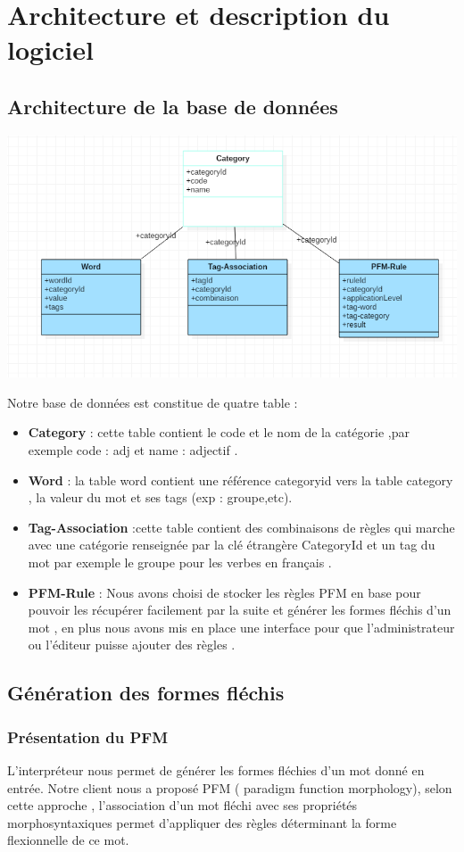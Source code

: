 \documentclass[12pt,a4paper]{article}
\begin{document}
\section{Architecture et description du logiciel}
\subsection{Architecture de la base de données }

\includegraphics[width=150mm]{img/basefinal.PNG}

Notre base de données est constitue de quatre table : 
\begin{itemize}
\item \textbf{Category} : cette table contient le code et le nom de la catégorie ,par exemple code : adj et name : adjectif .
\item \textbf{Word} : la table word contient une référence categoryid vers la table category , la valeur du mot et ses tags (exp : groupe,etc).
\item \textbf{Tag-Association} :cette table contient des combinaisons de règles qui marche avec une catégorie renseignée par la clé étrangère CategoryId  et un tag du mot par exemple le groupe pour les verbes en français .
\item \textbf{PFM-Rule} : Nous avons choisi de stocker les règles PFM en base pour pouvoir les récupérer facilement par la suite et générer les formes fléchis d'un mot , en plus nous avons mis en place une interface pour que l'administrateur ou l'éditeur puisse ajouter des règles .

\end{itemize}
\subsection{Génération des formes fléchis  }
\subsubsection{Présentation du PFM }
L'interpréteur  nous permet de générer les formes fléchies d'un mot donné en entrée. 
Notre client nous a proposé PFM ( paradigm function morphology), selon cette approche , l'association d'un mot fléchi avec ses propriétés morphosyntaxiques permet d'appliquer des règles déterminant la forme flexionnelle de ce mot.
\end{document}
